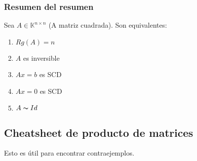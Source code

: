 \documentclass{article}
\newcommand{\cuerpo}{\mathbb{K}}                        %
\begin{document}
\subsubsection*{Resumen del resumen}
Sea $A \in \cuerpo^{n \times n}$ (A matriz cuadrada). Son equivalentes:
\begin{enumerate}
    \item $Rg(A)=n$
    \item $A$ es inversible
    \item $Ax=b$ es SCD
    \item $Ax=0$ es SCD
    \item $A \thicksim Id$
\end{enumerate}

\subsection{Cheatsheet de producto de matrices}
Esto es útil para encontrar contraejemplos.
\end{document}
